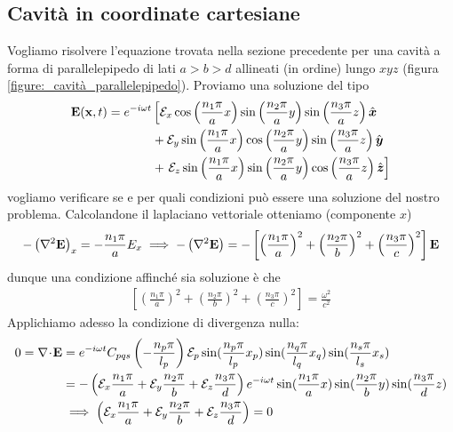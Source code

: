 \subsection{Cavità in coordinate cartesiane}

Vogliamo risolvere l'equazione trovata nella sezione precedente per una cavità a forma di parallelepipedo di lati $ a > b > d $ allineati (in ordine) lungo 
$ xyz $ (figura \ref{figure:_cavità_parallelepipedo}). Proviamo una soluzione del tipo 
\begin{align}
  \mathbf{ E }(\mathbf{ x }, t) = e^{-i\omega t}& \left[  \mathcal{E}_x \cos\left( \frac{n_1\pi}{a}x \right) \sin\left( \frac{n_2\pi}{a}y \right) 
  \sin\left( \frac{n_3\pi}{a}z \right)\hat{\boldsymbol{x}} \right.
  \\
  &+  \mathcal{E}_y \sin\left( \frac{n_1\pi}{a}x \right) \cos\left( \frac{n_2\pi}{a}y \right) 
  \sin\left( \frac{n_3\pi}{a}z \right)\hat{\boldsymbol{y}}
  \\
  &+ \left. \mathcal{E}_z \sin\left( \frac{n_1\pi}{a}x \right) \sin\left( \frac{n_2\pi}{a}y \right)
  \cos\left( \frac{n_3\pi}{a}z \right)\hat{\boldsymbol{z}} \right]
\end{align}
vogliamo verificare se e per quali condizioni può essere una soluzione del nostro problema. Calcolandone il laplaciano vettoriale otteniamo 
(componente $ x $)
\begin{align}
  - \left( \nabla^2 \mathbf{ E } \right)_x = - \frac{n_1\pi}{a} E_x \implies - \left( \nabla^2 \mathbf{ E } \right) 
  = -\left[ \left( \frac{n_1\pi}{a} \right)^2 + \left( \frac{n_2\pi}{b} \right)^2 + \left( \frac{n_3\pi}{c} \right)^2 \right] \mathbf{ E }
\end{align}
dunque una condizione affinché sia soluzione è che
\begin{align}
  \left[ \left( \frac{n_1\pi}{a} \right)^2 + \left( \frac{n_2\pi}{b} \right)^2 + \left( \frac{n_3\pi}{c} \right)^2 \right] = \frac{\omega^2}{c^2} \label{condizione_1}
\end{align}
Applichiamo adesso la condizione di divergenza nulla:
\begin{align}
  0 = \nabla\!\cdot\!\mathbf{ E } &= e^{-i \omega t} C_{pqs} \left( -\frac{n_p \pi}{l_p} \right) \mathcal{E}_p \sin(\frac{n_p \pi}{l_p}x_p) 
  \sin(\frac{n_q \pi}{l_q}x_q) \sin(\frac{n_s \pi}{l_s}x_s)
  \\
  &= - \left( \mathcal{E}_x \frac{n_1 \pi}{a} + \mathcal{E}_y \frac{n_2 \pi}{b} + \mathcal{E}_z \frac{n_3 \pi}{d} \right) e^{-i\omega t} 
  \sin(\frac{n_1 \pi}{a}x) \sin(\frac{n_2 \pi}{b}y) \sin(\frac{n_3 \pi}{d}z) 
  \\
  &\implies \left( \mathcal{E}_x \frac{n_1 \pi}{a} + \mathcal{E}_y \frac{n_2 \pi}{b} + \mathcal{E}_z \frac{n_3 \pi}{d} \right) = 0 \label{condizione_2}
\end{align}
